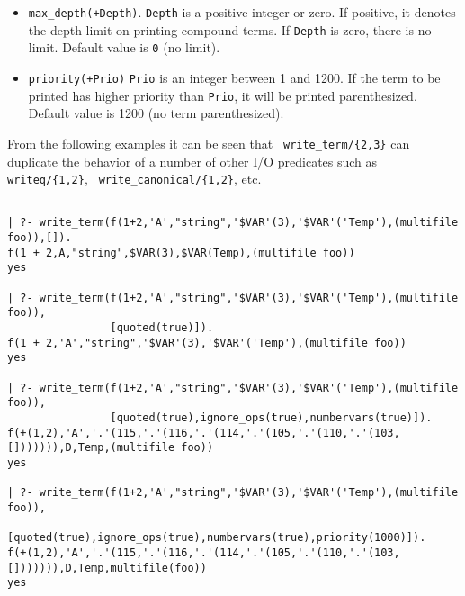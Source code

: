 \begin{description}
\begin{itemize}
%
\item {\tt max\_depth(+Depth)}. {\tt Depth} is a positive integer or
zero. If positive, it denotes the depth limit on printing compound
terms. If {\tt Depth} is zero, there is no limit. Default value is
{\tt 0} (no limit).
%
\item {\tt priority(+Prio)} {\tt Prio} is an integer between 1 and
1200.  If the term to be printed has higher priority than {\tt Prio},
it will be printed parenthesized.  Default value is 1200 (no term
parenthesized).
\end{itemize}

From the following examples it can be seen that {\tt
write\_term/\{2,3\}} can duplicate the behavior of a number of other
I/O predicates such as {\tt writeq/\{1,2\}}, {\tt
write\_canonical/\{1,2\}}, etc.
{\small
\begin{verbatim}

| ?- write_term(f(1+2,'A',"string",'$VAR'(3),'$VAR'('Temp'),(multifile foo)),[]).
f(1 + 2,A,"string",$VAR(3),$VAR(Temp),(multifile foo))
yes

| ?- write_term(f(1+2,'A',"string",'$VAR'(3),'$VAR'('Temp'),(multifile foo)),
                [quoted(true)]).
f(1 + 2,'A',"string",'$VAR'(3),'$VAR'('Temp'),(multifile foo))
yes

| ?- write_term(f(1+2,'A',"string",'$VAR'(3),'$VAR'('Temp'),(multifile foo)),
                [quoted(true),ignore_ops(true),numbervars(true)]).
f(+(1,2),'A','.'(115,'.'(116,'.'(114,'.'(105,'.'(110,'.'(103,[])))))),D,Temp,(multifile foo))
yes

| ?- write_term(f(1+2,'A',"string",'$VAR'(3),'$VAR'('Temp'),(multifile foo)),
                [quoted(true),ignore_ops(true),numbervars(true),priority(1000)]).
f(+(1,2),'A','.'(115,'.'(116,'.'(114,'.'(105,'.'(110,'.'(103,[])))))),D,Temp,multifile(foo))
yes
\end{verbatim}
}


\end{description}
